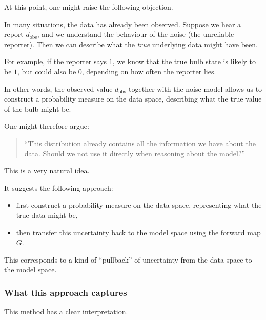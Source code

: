 \documentclass[11pt]{article}
\theoremstyle{remark}
\begin{document}
At this point, one might raise the following objection.

\vspace{2mm}

In many situations, the data has already been observed. Suppose we hear a report \(d_{\mathrm{obs}}\), and we understand the behaviour of the noise (the unreliable reporter). Then we can describe what the \emph{true} underlying data might have been.

For example, if the reporter says \(1\), we know that the true bulb state is likely to be \(1\), but could also be \(0\), depending on how often the reporter lies.

\vspace{2mm}

In other words, the observed value \(d_{\mathrm{obs}}\) together with the noise model allows us to construct a probability measure on the data space, describing what the true value of the bulb might be.

One might therefore argue:

\begin{quote}
``This distribution already contains all the information we have about the data. Should we not use it directly when reasoning about the model?''
\end{quote}

\vspace{2mm}

This is a very natural idea.

It suggests the following approach:

\begin{itemize}
    \item first construct a probability measure on the data space, representing what the true data might be,
    \item then transfer this uncertainty back to the model space using the forward map \(G\).
\end{itemize}

This corresponds to a kind of ``pullback'' of uncertainty from the data space to the model space.

\vspace{2mm}

\subsubsection{What this approach captures}

This method has a clear interpretation.
\end{document}
